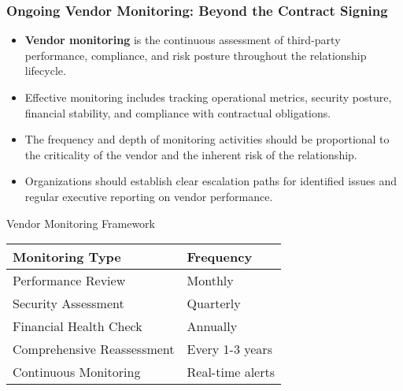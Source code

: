 \documentclass{beamer}
\begin{document}
\begin{frame}
    \frametitle{Ongoing Vendor Monitoring: Beyond the Contract Signing}
    
    \begin{itemize}
        \item \textbf{Vendor monitoring} is the continuous assessment of third-party performance, compliance, and risk posture throughout the relationship lifecycle.
        \item Effective monitoring includes tracking operational metrics, security posture, financial stability, and compliance with contractual obligations.
        \item The frequency and depth of monitoring activities should be proportional to the criticality of the vendor and the inherent risk of the relationship.
        \item Organizations should establish clear escalation paths for identified issues and regular executive reporting on vendor performance.
    \end{itemize}
    
    \begin{block}{Vendor Monitoring Framework}
        \scriptsize
        \begin{tabular}{ll}
            \textbf{Monitoring Type} & \textbf{Frequency} \\
            \hline
            Performance Review & Monthly \\
            Security Assessment & Quarterly \\
            Financial Health Check & Annually \\
            Comprehensive Reassessment & Every 1-3 years \\
            Continuous Monitoring & Real-time alerts \\
        \end{tabular}
    \end{block}
\end{frame}
\end{document}
